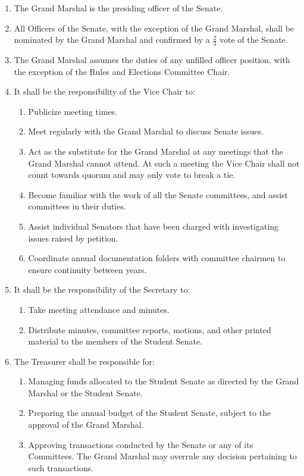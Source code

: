 
\begin{enumerate}

\item The Grand Marshal is the presiding officer of the Senate.

\item All Officers of the Senate, with the exception of the Grand Marshal, shall be nominated by the Grand Marshal and confirmed
by a $\frac{2}{3}$ vote of the Senate.

\item The Grand Marshal assumes the duties of any unfilled officer position, with the exception of the Rules and Elections
Committee Chair.

\item It shall be the responsibility of the Vice Chair to:
\begin{enumerate}
\item Publicize meeting times.
\item Meet regularly with the Grand Marshal to discuss Senate issues.
\item Act as the substitute for the Grand Marshal at any meetings that the Grand Marshal cannot attend. At such a meeting the
Vice Chair shall not count towards quorum and may only vote to break a tie.
\item Become familiar with the work of all the Senate committees, and assist committees in their duties.
\item Assist individual Senators that have been charged with investigating issues raised by petition.
\item Coordinate annual documentation folders with committee chairmen to ensure continuity between years.
\end{enumerate}

\item It shall be the responsibility of the Secretary to:
\begin{enumerate}
\item Take meeting attendance and minutes.
\item Distribute minutes, committee reports, motions, and other printed material to the members of the Student Senate.
\end{enumerate}

\item The Treasurer shall be responsible for:
\begin{enumerate}
\item Managing funds allocated to the Student Senate as directed by the Grand Marshal or the Student Senate.
\item Preparing the annual budget of the Student Senate, subject to the approval of the Grand Marshal.
\item Approving transactions conducted by the Senate or any of its Committees. The Grand Marshal may overrule any decision
pertaining to such transactions.
\end{enumerate}


\end{enumerate}
